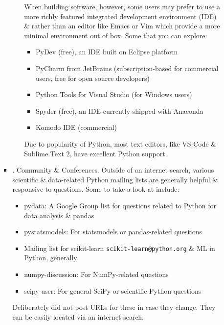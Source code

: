 \documentclass{article}
\begin{document}
\begin{enumerate}
\begin{itemize}
\begin{itemize}
\begin{itemize}
				When building software, however, some users may prefer to use a more richly featured integrated development environment (IDE) \& rather than an editor like Emacs or Vim which provide a more minimal environment out of box. Some that you can explore:
				\begin{itemize}
					\item PyDev (free), an IDE built on Eclipse platform
					\item PyCharm from JetBrains (subscription-based for commercial users, free for open source developers)
					\item Python Tools for Visual Studio (for Windows users)
					\item Spyder (free), an IDE currently shipped with Anaconda
					\item Komodo IDE (commercial)
				\end{itemize}
				Due to popularity of Python, most text editors, like VS Code \& Sublime Text 2, have excellent Python support.
			\end{itemize}
			\item {. Community \& Conferences.} Outside of an internet search, various scientific \& data-related Python mailing lists are generally helpful \& responsive to questions. Some to take a look at include:
			\begin{itemize}
				\item pydata: A Google Group list for questions related to Python for data analysis \& pandas
				\item pystatsmodels: For statsmodels or pandas-related questions
				\item Mailing list for scikit-learn \verb|scikit-learn@python.org| \& ML in Python, generally
				\item numpy-discussion: For NumPy-related questions
				\item scipy-user: For general SciPy or scientific Python questions
			\end{itemize}
			Deliberately did not post URLs for these in case they change. They can be easily located via an internet search.
			

\end{itemize}
\end{itemize}
\end{enumerate}
\end{document}
